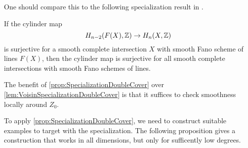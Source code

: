 One should compare this to the following specialization result in \cite{VoisinConiveauThreefolds}.
\begin{lemma}
	\label{lem:VoisinSpecializationDoubleCover}
	If the cylinder map 
	\[H_{n-2}(F(X),\mathbb{Z}) \to H_n(X,\mathbb{Z})\]
	is surjective for a smooth complete intersection $X$ with smooth Fano scheme of lines $F(X)$, then the cylinder map is surjective for all smooth complete intersections with smooth Fano schemes of lines.
\end{lemma}
The benefit of \cref{prop:SpecializationDoubleCover} over \cref{lem:VoisinSpecializationDoubleCover} is that it suffices to check smoothness locally around $Z_0$.

To apply \cref{prop:SpecializationDoubleCover}, we need to construct suitable examples to target with the specialization. The following proposition gives a construction that works in all dimensions, but only for sufficently low degrees.

